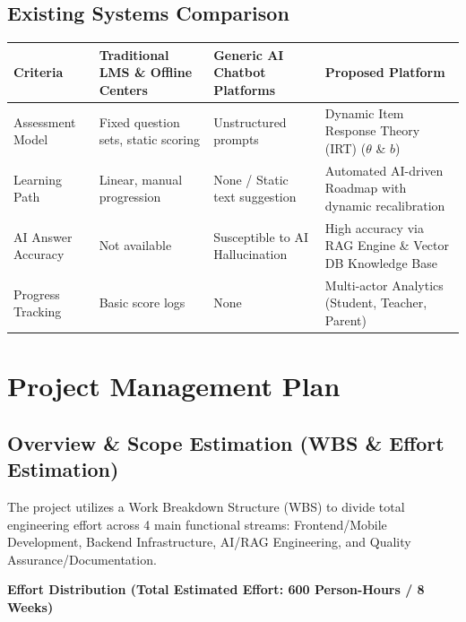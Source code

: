 \documentclass[12pt,a4paper]{article}
\begin{document}
\subsection{Existing Systems Comparison}
\begin{table}[H]
\centering
\small
\renewcommand{\arraystretch}{1.3}
\begin{tabularx}{\textwidth}{p{2.6cm} X X X}
\toprule
\textbf{Criteria} & \textbf{Traditional LMS \& Offline Centers} & \textbf{Generic AI Chatbot Platforms} & \textbf{Proposed Platform} \\
\midrule
Assessment Model & Fixed question sets, static scoring & Unstructured prompts & Dynamic Item Response Theory (IRT) ($\theta$ \& $b$) \\
\addlinespace[0.3em]
Learning Path & Linear, manual progression & None / Static text suggestion & Automated AI-driven Roadmap with dynamic recalibration \\
\addlinespace[0.3em]
AI Answer Accuracy & Not available & Susceptible to AI Hallucination & High accuracy via RAG Engine \& Vector DB Knowledge Base \\
\addlinespace[0.3em]
Progress Tracking & Basic score logs & None & Multi-actor Analytics (Student, Teacher, Parent) \\
\bottomrule
\end{tabularx}
\end{table}


\section{Project Management Plan}

\subsection{Overview \& Scope Estimation (WBS \& Effort Estimation)}
The project utilizes a Work Breakdown Structure (WBS) to divide total engineering effort across 4 main functional streams: Frontend/Mobile Development, Backend Infrastructure, AI/RAG Engineering, and Quality Assurance/Documentation.

\vspace{0.3cm}
\noindent\textbf{Effort Distribution (Total Estimated Effort: 600 Person-Hours / 8 Weeks)}
\end{document}

